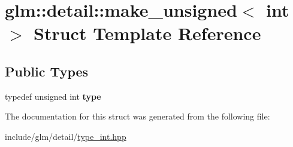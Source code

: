 \hypertarget{structglm_1_1detail_1_1make__unsigned_3_01int_01_4}{}\section{glm\+:\+:detail\+:\+:make\+\_\+unsigned$<$ int $>$ Struct Template Reference}
\label{structglm_1_1detail_1_1make__unsigned_3_01int_01_4}
\subsection*{Public Types}
\begin{DoxyCompactItemize}
\item 
\mbox{\label{structglm_1_1detail_1_1make__unsigned_3_01int_01_4_ac3fd57ed35c0305bbe941009a84139c1}} 
typedef unsigned int {\bfseries type}
\end{DoxyCompactItemize}


The documentation for this struct was generated from the following file\+:\begin{DoxyCompactItemize}
\item 
include/glm/detail/\hyperlink{type__int_8hpp}{type\+\_\+int.\+hpp}\end{DoxyCompactItemize}
